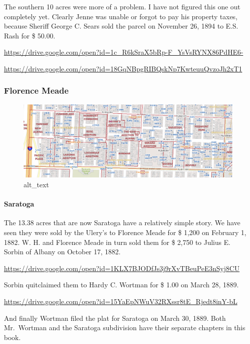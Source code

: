 \documentclass[
  12pt,
]{book}
\begin{document}
The southern 10 acres were more of a problem. I have not figured this one out completely yet. Clearly Jenne was unable or forgot to pay his property taxes, because Sheriff George C. Sears sold the parcel on November 26, 1894 to E.S. Rash for \$ 50.00.

\url{https://drive.google.com/open?id=1c_R6kSraX5bRp-F_YsVsRYNX86PdHE6-}

\url{https://drive.google.com/open?id=18GqNBpgRIBQskNp7KwteuuQvzoJh2xT1}

\hypertarget{florence-meade}{%
\subsubsection{Florence Meade}\label{florence-meade}}

\begin{figure}
\centering
\includegraphics{images/0202a_images/image6.png}
\caption{alt\_text}
\end{figure}

\hypertarget{saratoga}{%
\paragraph{Saratoga}\label{saratoga}}

The 13.38 acres that are now Saratoga have a relatively simple story. We have seen they were sold by the Ulery's to Florence Meade for \$ 1,200 on February 1, 1882. W. H. and Florence Meade in turn sold them for \$ 2,750 to Julius E. Sorbin of Albany on October 17, 1882.

\url{https://drive.google.com/open?id=1KLX7BJODfJs3j9rXvTBeuPeE3nSyj8CU}

Sorbin quitclaimed them to Hardy C. Wortman for \$ 1.00 on March 28, 1889.

\url{https://drive.google.com/open?id=15YaEpNWuV32RXssr8tE_Rjedt8inY-bL}

And finally Wortman filed the plat for Saratoga on March 30, 1889. Both Mr.~Wortman and the Saratoga subdivision have their separate chapters in this book.
\end{document}

